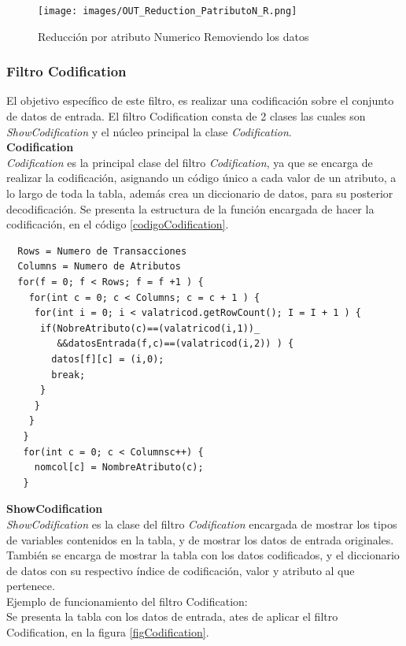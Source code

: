 \begin{figure}[h]
\centering
\texttt{[image: images/OUT\_Reduction\_PatributoN\_R.png]}
\caption{Reducci\'on por atributo Numerico Removiendo los datos}
\label{Reduction_PatributoN_R}
\end{figure}

\subsubsection{Filtro Codification}
El objetivo espec\'ifico de este filtro, es realizar una codificaci\'on sobre el conjunto de datos de entrada.
El filtro  Codification consta de 2 clases las cuales son \textit{ShowCodification} y el n\'ucleo principal la clase \textit{Codification}. \\

\textbf{Codification} \\
\textit{Codification} es la principal clase del filtro \textit{Codification}, ya que se encarga de realizar la codificaci\'on, asignando un c\'odigo \'unico a cada valor de un atributo, a lo largo de toda la tabla, adem\'as crea un diccionario de datos, para su posterior decodificaci\'on.
Se presenta la estructura de la funci\'on encargada de hacer  la codificaci\'on, en el c\'odigo \ref{codigoCodification}. \\

\begin{codigof}[!h]
\fontsize{8}{2}
\begin{verbatim}  
  Rows = Numero de Transacciones
  Columns = Numero de Atributos
  for(f = 0; f < Rows; f = f +1 ) {
    for(int c = 0; c < Columns; c = c + 1 ) {
     for(int i = 0; i < valatricod.getRowCount(); I = I + 1 ) {              
      if(NobreAtributo(c)==(valatricod(i,1))_
         &&datosEntrada(f,c)==(valatricod(i,2)) ) {
        datos[f][c] = (i,0);
        break;
      } 
     } 
    } 
   }
   for(int c = 0; c < Columnsc++) {
     nomcol[c] = NombreAtributo(c); 
   }
\end{verbatim}
\caption{Pseudo Codigo de Codification}
\label{codigoCodification}
\end{codigof}

\textbf{ShowCodification} \\
\textit{ShowCodification} es la clase del filtro \textit{Codification} encargada de mostrar los tipos de variables contenidos en la tabla, y de mostrar los datos de entrada originales. Tambi\'en se encarga de mostrar la tabla con los datos codificados, y el diccionario de datos con su respectivo \'indice de codificaci\'on, valor y atributo al que pertenece.\\
Ejemplo de funcionamiento del filtro Codification:\\
Se presenta la tabla con los datos de entrada, ates de aplicar el filtro Codification, en la figura \ref{figCodification}. \\

